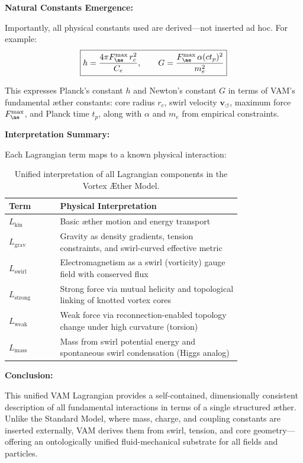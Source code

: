 \documentclass[a4paper,12pt]{article}
\renewcommand{\arraystretch}{1.5}
\begin{document}
\vspace{1em}
\noindent
\textbf{Natural Constants Emergence:}

Importantly, all physical constants used are derived—not inserted ad hoc. For example:
\[
\boxed{
h = \frac{4\pi F^{\max}_{\ae} \, r_c^2}{C_e}, \qquad
G = \frac{F^{\max}_{\ae} \, \alpha (ct_p)^2}{m_e^2}
}
\]

This expresses Planck’s constant \( h \) and Newton’s constant \( G \) in terms of VAM’s fundamental æther constants: core radius \( r_c \), swirl velocity \( \mathbf{v}_{\scriptscriptstyle\boldsymbol{\circlearrowleft}} \), maximum force \( F^{\max}_{\ae} \), and Planck time \( t_p \), along with \( \alpha \) and \( m_e \) from empirical constraints.

\vspace{1em}
\noindent
\textbf{Interpretation Summary:}

Each Lagrangian term maps to a known physical interaction:

\begin{table}[H]
\centering
\renewcommand{\arraystretch}{1.2}
\begin{tabular}{|l|p{0.78\linewidth}|}
\hline
\textbf{Term} & \textbf{Physical Interpretation} \\
\hline
\( L_{\text{kin}} \) & Basic æther motion and energy transport \\
\( L_{\text{grav}} \) & Gravity as density gradients, tension constraints, and swirl-curved effective metric \\
\( L_{\text{swirl}} \) & Electromagnetism as a swirl (vorticity) gauge field with conserved flux \\
\( L_{\text{strong}} \) & Strong force via mutual helicity and topological linking of knotted vortex cores \\
\( L_{\text{weak}} \) & Weak force via reconnection-enabled topology change under high curvature (torsion) \\
\( L_{\text{mass}} \) & Mass from swirl potential energy and spontaneous swirl condensation (Higgs analog) \\
\hline
\end{tabular}
\caption{Unified interpretation of all Lagrangian components in the Vortex Æther Model.}
\end{table}

\vspace{1em}
\noindent
\textbf{Conclusion:}

This unified VAM Lagrangian provides a self-contained, dimensionally consistent description of all fundamental interactions in terms of a single structured æther. Unlike the Standard Model, where mass, charge, and coupling constants are inserted externally, VAM derives them from swirl, tension, and core geometry—offering an ontologically unified fluid-mechanical substrate for all fields and particles.
\end{document}
